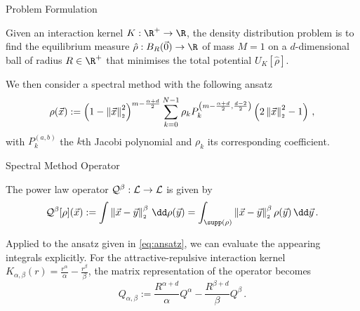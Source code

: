\documentclass[aspectratio=169, hyperref={colorlinks=true}]{beamer}
\begin{document}
  \begin{frame}{Problem Formulation}
    \begin{definition}
      Given an interaction kernel $K: \R^+ \to \R$, the density distribution problem is to find the equilibrium measure $\hat{\rho}: B_R(\vec{0}) \to \R$ of mass $M = 1$ on a $d$-dimensional ball of radius $R \in \R^+$ that minimises the total potential $U_K[\hat{\rho}]$.
    \end{definition}
    \pause

    We then consider a \alert{spectral method} with the following ansatz
    \begin{equation}
      \rho(\vec{x}) := \left(1-\left\lVert\vec{x}\right\rVert_{\scriptscriptstyle 2}^{2}\right)^{m - \frac{\alpha + d}{2}} \sum_{k=0}^{N-1} \rho_k P_{k}^{\left(m - \frac{\alpha + d}{2},\frac{d-2}{2}\right)}\left(2 \left\lVert\vec{x}\right\rVert_{\scriptscriptstyle 2}^{2}-1\right)\,,
      \label{eq:ansatz}
    \end{equation}
    with $P_k^{(a, b)}$ the $k$th Jacobi polynomial and $\rho_k$ its corresponding coefficient.
  \end{frame}

  \begin{frame}{Spectral Method Operator}
    \begin{definition}
      The power law operator $\mathcal{Q}^\beta: \mathcal{L} \to \mathcal{L}$ is given by
      $$\mathcal{Q}^\beta[\rho](\vec{x}) := \int \norm{\vec{x}-\vec{y}}^\beta \,\dd\rho(\vec{y}) = \int_{\supp(\rho)} \norm{\vec{x}-\vec{y}}^\beta \rho(\vec{y}) \,\dd\vec{y}\,.$$
    \end{definition}

    Applied to the ansatz given in \eqref{eq:ansatz}, we can evaluate the appearing integrals \alert{explicitly}.
    For the attractive-repulsive interaction kernel $K_{\alpha,\beta}(r) = \frac{r^\alpha}{\alpha} - \frac{r^\beta}{\beta}$, the matrix representation of the operator becomes
    \begin{equation}
      Q_{\alpha, \beta} := \frac{R^{\alpha+d}}{\alpha} Q^\alpha - \frac{R^{\beta+d}}{\beta} Q^\beta\,.
      \label{eq:full-attrep-operator}
    \end{equation}
  \end{frame}
\end{document}
